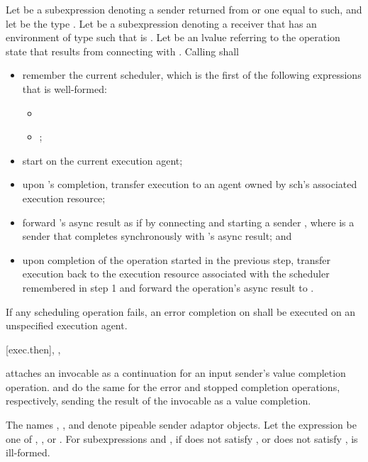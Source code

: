 \pnum
Let  be a subexpression denoting
a sender returned from  or one equal to such, and
let  be the type .
Let  be a subexpression denoting a receiver
that has an environment of type 
such that  is .
Let  be an lvalue referring to the operation state
that results from connecting  with .
Calling  shall
\begin{itemize}
\item
remember the current scheduler,
which is the first of the following expressions that is well-formed:
\begin{itemize}
\item {}
\item {};
\end{itemize}
\item
start  on the current execution agent;
\item
upon 's completion,
transfer execution to an agent
owned by sch's associated execution resource;
\item
forward 's async result as if by
connecting and starting a sender ,
where  is a sender
that completes synchronously with 's async result; and
\item
upon completion of the operation started in the previous step,
transfer execution back to the execution resource
associated with the scheduler remembered in step 1 and
forward the operation's async result to .
\end{itemize}
If any scheduling operation fails,
an error completion on  shall be executed on
an unspecified execution agent.

[exec.then]{, , }

\pnum
{} attaches an invocable as a continuation
for an input sender's value completion operation.
 and  do the same
for the error and stopped completion operations, respectively,
sending the result of the invocable as a value completion.

\pnum
The names , , and 
denote pipeable sender adaptor objects.
Let the expression  be one of
, , or .
For subexpressions  and ,
if  does not satisfy , or
 does not satisfy ,
is ill-formed.

